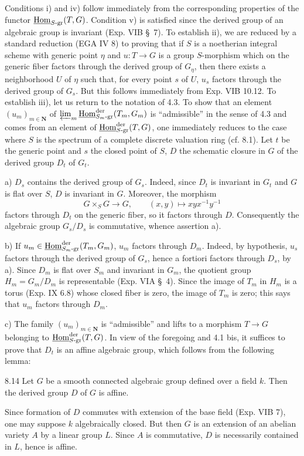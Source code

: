 Conditions i) and iv) follow immediately from the corresponding properties of the functor $\underline{\operatorname{Hom}}_{S\text{-gr}}(T,G)$. Condition v) is satisfied since the derived group of an algebraic group is invariant (Exp. VIB \S\ 7). To establish ii), we are reduced by a standard reduction (EGA IV 8) to proving that if $S$ is a noetherian integral scheme with generic point $\eta$ and $u:T\to G$ is a group $S$-morphism which on the generic fiber factors through the derived group of $G_\eta$, then there exists a neighborhood $U$ of $\eta$ such that, for every point $s$ of $U$, $u_s$ factors through the derived group of $G_s$. But this follows immediately from Exp. VIB 10.12. To establish iii), let us return to the notation of 4.3. To show that an element $(u_m)_{m\in\mathbf N}$ of $\varprojlim_m\underline{\operatorname{Hom}}^{\mathrm{der}}_{S_m\text{-gr}}(T_m,G_m)$ is ``admissible'' in the sense of 4.3 and comes from an element of $\underline{\operatorname{Hom}}^{\mathrm{der}}_{S\text{-gr}}(T,G)$, one immediately reduces to the case where $S$ is the spectrum of a complete discrete valuation ring (cf. 8.1). Let $t$ be the generic point and $s$ the closed point of $S$, $D$ the schematic closure in $G$ of the derived group $D_t$ of $G_t$.

\noindent a) $D_s$ contains the derived group of $G_s$. Indeed, since $D_t$ is invariant in $G_t$ and $G$ is flat over $S$, $D$ is invariant in $G$. Moreover, the morphism
\[
G\times_S G\longrightarrow G,\qquad(x,y)\longmapsto xyx^{-1}y^{-1}
\]
factors through $D_t$ on the generic fiber, so it factors through $D$. Consequently the algebraic group $G_s/D_s$ is commutative, whence assertion a).

\noindent b) If $u_m\in\underline{\operatorname{Hom}}^{\mathrm{der}}_{S_m\text{-gr}}(T_m,G_m)$, $u_m$ factors through $D_m$. Indeed, by hypothesis, $u_s$ factors through the derived group of $G_s$, hence a fortiori factors through $D_s$, by a). Since $D_m$ is flat over $S_m$ and invariant in $G_m$, the quotient group $H_m=G_m/D_m$ is representable (Exp. VIA \S\ 4). Since the image of $T_m$ in $H_m$ is a torus (Exp. IX 6.8) whose closed fiber is zero, the image of $T_m$ is zero; this says that $u_m$ factors through $D_m$.

\noindent c) The family $(u_m)_{m\in\mathbf N}$ is ``admissible'' and lifts to a morphism $T\to G$ belonging to $\underline{\operatorname{Hom}}^{\mathrm{der}}_{S\text{-gr}}(T,G)$. In view of the foregoing and 4.1 bis, it suffices to prove that $D_t$ is an affine algebraic group, which follows from the following lemma:
\begin{lemma}{8.14}\label{XV.8.14}
Let $G$ be a smooth connected algebraic group defined over a field $k$. Then the derived group $D$ of $G$ is affine.
\end{lemma}
Since formation of $D$ commutes with extension of the base field (Exp. VIB 7), one may suppose $k$ algebraically closed. But then $G$ is an extension of an abelian variety $A$ by a linear group $L$. Since $A$ is commutative, $D$ is necessarily contained in $L$, hence is affine.

